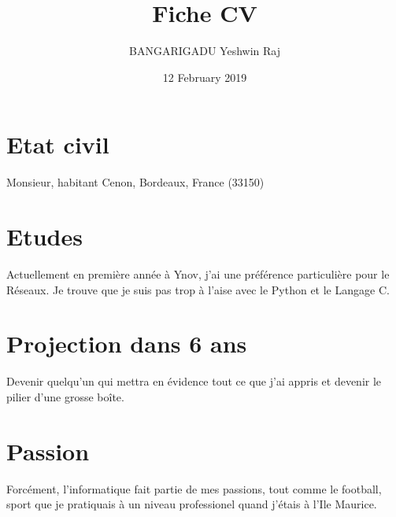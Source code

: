 \documentclass[12pt]{article}
\title{Fiche CV}
\author{BANGARIGADU Yeshwin Raj}
\date{12 February 2019}
\begin{document}
\maketitle

\section{Etat civil}
Monsieur, habitant Cenon, Bordeaux, France (33150)


\section{Etudes}
Actuellement en première année à Ynov, j'ai une préférence particulière pour le Réseaux. Je trouve que je suis pas trop à l'aise avec le Python et le Langage C.

\section{Projection dans 6 ans}
Devenir quelqu'un qui mettra en évidence tout ce que j'ai appris et devenir le pilier d'une grosse boîte.

\section{Passion}
Forcément, l'informatique fait partie de mes passions, tout comme le football, sport que je pratiquais à un niveau professionel quand j'étais à l'Ile Maurice.
\end{document}
